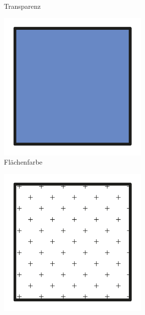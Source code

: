 \begin{figure}[h!tbp]
\begin{subfigure}{.25\textwidth}
  \caption*{Transparenz}
\end{subfigure}
\begin{subfigure}{.25\textwidth}
  \centering
  \includegraphics[width=\linewidth]{bilder/vektor_pfadLayoutattributeE.pdf}
  \caption*{Flächenfarbe}
\end{subfigure}%
\begin{subfigure}{.25\textwidth}
  \centering
  \includegraphics[width=\linewidth]{bilder/vektor_pfadLayoutattributeF.pdf}

\end{subfigure}
\end{figure}
